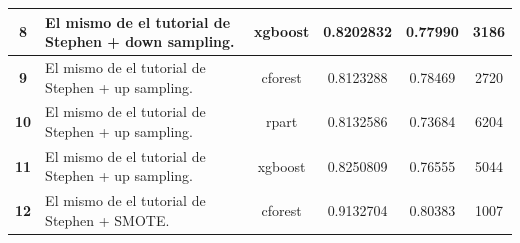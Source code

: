 \documentclass[10pt,a4paper]{article}
\begin{document}
\begin{landscape}
\begin{table}[H]
\begin{tabular}{|c|l|c|c|c|c|}
\textbf{8}                        & El mismo de el tutorial de Stephen + down sampling.                                                                                                                                                                                                                         & xgboost                                & 0.8202832                                                        & 0.77990                                                         & 3186             \\ \hline
\textbf{9}                        & El mismo de el tutorial de Stephen + up sampling.                                                                                                                                                                                                                           & cforest                                & 0.8123288                                                        & 0.78469                                                         & 2720             \\ \hline
\textbf{10}                       & El mismo de el tutorial de Stephen + up sampling.                                                                                                                                                                                                                           & rpart                                  & 0.8132586                                                        & 0.73684                                                         & 6204             \\ \hline
\textbf{11}                       & El mismo de el tutorial de Stephen + up sampling.                                                                                                                                                                                                                           & xgboost                                & 0.8250809                                                        & 0.76555                                                         & 5044             \\ \hline
\multicolumn{1}{|l|}{\textbf{12}} & El mismo de el tutorial de Stephen + SMOTE.                                                                                                                                                                                                                                 & cforest                                & 0.9132704                                                        & 0.80383                                                         & 1007             \\ \hline

\end{tabular}
\end{table}
\end{landscape}
\end{document}
